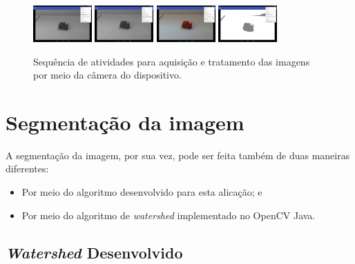 \begin{figure}[!htb]
 \centering
 \def\baselinestretch{1}\small\normalsize
 \includegraphics[width=0.2\textwidth]{img/camera_app_n5.png}\qquad
 \includegraphics[width=0.2\textwidth]{img/camera_app_n6.png}  \qquad 
 \includegraphics[width=0.2\textwidth]{img/camera_app_n7.png}  \qquad
 \includegraphics[width=0.2\textwidth]{img/camera_app_n8.png}        
 \caption{\label{fig:indiosegmentado}Sequência de atividades para aquisição e tratamento das imagens por meio da câmera do dispositivo.}
\end{figure}


\section{Segmentação da imagem}\label{sec:segmentacao_aplicacao}

A segmentação da imagem, por sua vez, pode ser feita também de duas maneiras diferentes:
\begin{itemize}
    \item Por meio do algoritmo desenvolvido para esta alicação; e
    \item Por meio do algoritmo de \textit{watershed} implementado no OpenCV Java.
\end{itemize}

\subsection{\textit{Watershed} Desenvolvido}

